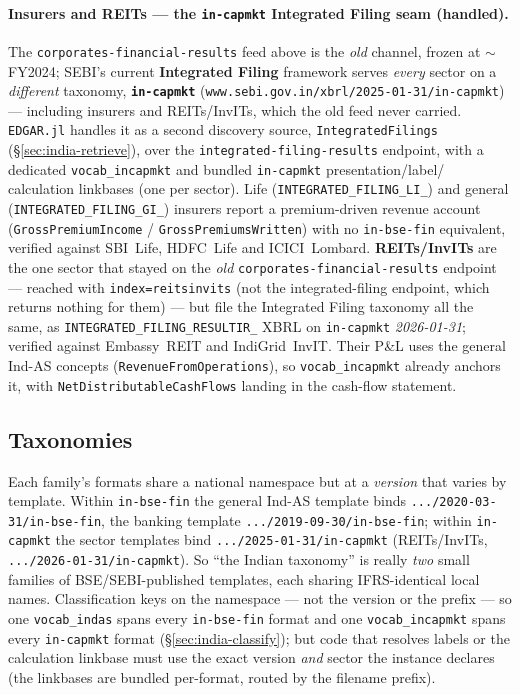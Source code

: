 \documentclass[11pt,a4paper]{report}
\begin{document}
\paragraph{Insurers and REITs --- the \texttt{in-capmkt} Integrated Filing seam (handled).} The
\texttt{corporates-financial-results} feed above is the \emph{old} channel, frozen at $\sim$FY2024; SEBI's
current \textbf{Integrated Filing} framework serves \emph{every} sector on a \emph{different} taxonomy,
\textbf{\texttt{in-capmkt}} (\texttt{www.sebi.gov.in/xbrl/2025-01-31/in-capmkt}) --- including insurers and
REITs/InvITs, which the old feed never carried. \texttt{EDGAR.jl} handles it as a second discovery source,
\texttt{IntegratedFilings} (\S\ref{sec:india-retrieve}), over the \texttt{integrated-filing-results}
endpoint, with a dedicated \texttt{vocab\_incapmkt} and bundled \texttt{in-capmkt} presentation/label/
calculation linkbases (one per sector). Life (\texttt{INTEGRATED\_FILING\_LI\_}) and general
(\texttt{INTEGRATED\_FILING\_GI\_}) insurers report a premium-driven revenue account
(\texttt{GrossPremiumIncome} / \texttt{GrossPremiumsWritten}) with no \texttt{in-bse-fin} equivalent, verified
against SBI~Life, HDFC~Life and ICICI~Lombard. \textbf{REITs/InvITs} are the one sector that stayed on the
\emph{old} \texttt{corporates-financial-results} endpoint --- reached with \texttt{index=reitsinvits} (not the
integrated-filing endpoint, which returns nothing for them) --- but file the Integrated Filing taxonomy all
the same, as \texttt{INTEGRATED\_FILING\_RESULTIR\_} XBRL on \texttt{in-capmkt} \emph{2026-01-31}; verified
against Embassy~REIT and IndiGrid~InvIT. Their P\&L uses the general Ind-AS concepts
(\texttt{RevenueFromOperations}), so \texttt{vocab\_incapmkt} already anchors it, with
\texttt{NetDistributableCashFlows} landing in the cash-flow statement.

\subsection{Taxonomies}\label{sec:india-taxonomies}
Each family's formats share a national namespace but at a \emph{version} that varies by template. Within
\texttt{in-bse-fin} the general Ind-AS template binds \texttt{.../2020-03-31/in-bse-fin}, the banking
template \texttt{.../2019-09-30/in-bse-fin}; within \texttt{in-capmkt} the sector templates bind
\texttt{.../2025-01-31/in-capmkt} (REITs/InvITs, \texttt{.../2026-01-31/in-capmkt}). So ``the Indian
taxonomy'' is really \emph{two} small families of BSE/SEBI-published templates, each sharing IFRS-identical
local names. Classification keys on the namespace --- not the version or the prefix --- so one
\texttt{vocab\_indas} spans every \texttt{in-bse-fin} format and one \texttt{vocab\_incapmkt} spans every
\texttt{in-capmkt} format (\S\ref{sec:india-classify}); but code that resolves labels or the calculation
linkbase must use the exact version \emph{and} sector the instance declares (the linkbases are bundled
per-format, routed by the filename prefix).
\end{document}
